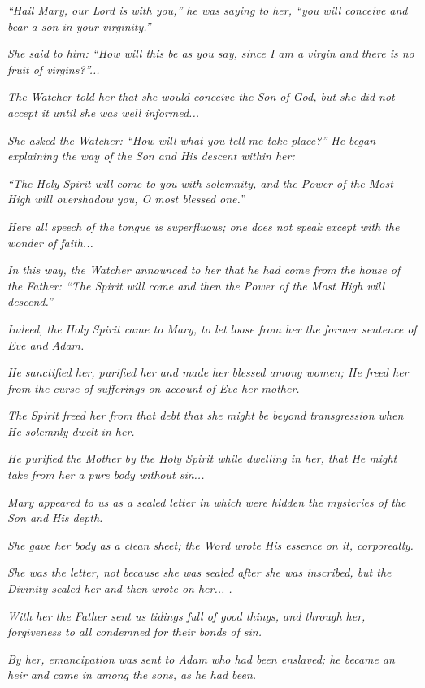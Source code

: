 \begin{quotex}
\emph{``Hail Mary, our Lord is with you,'' he was saying to her, ``you will conceive and bear a son in your virginity.''}

\emph{She said to him: ``How will this be as you say, since I am a virgin and there is no fruit of virgins?''... }

\emph{The Watcher told her that she would conceive the Son of God, but she did not accept it until she was well informed... }

\emph{She asked the Watcher: ``How will what you tell me take place?'' He began explaining the way of the Son and His descent within her:}

\emph{``The Holy Spirit will come to you with solemnity, and the Power of the Most High will overshadow you, O most blessed one.''}

\emph{Here all speech of the tongue is superfluous; one does not speak except with the wonder of faith... }

\emph{In this way, the Watcher announced to her that he had come from the house of the Father: ``The Spirit will come and then the Power of the Most High will descend.''}

\emph{Indeed, the Holy Spirit came to Mary, to let loose from her the former sentence of Eve and Adam.}

\emph{He sanctified her, purified her and made her blessed among women; He freed her from the curse of sufferings on account of Eve her mother.}

\emph{The Spirit freed her from that debt that she might be beyond transgression when He solemnly dwelt in her.}

\emph{He purified the Mother by the Holy Spirit while dwelling in her, that He might take from her a pure body without sin... }

\emph{Mary appeared to us as a sealed letter in which were hidden the mysteries of the Son and His depth.}

\emph{She gave her body as a clean sheet; the Word wrote His essence on it, corporeally.}

\emph{She was the letter, not because she was sealed after she was inscribed, but the Divinity sealed her and then wrote on her... .}

\emph{With her the Father sent us tidings full of good things, and through her, forgiveness to all condemned for their bonds of sin.}

\emph{By her, emancipation was sent to Adam who had been enslaved; he became an heir and came in among the sons, as he had been.}


\end{quotex}
